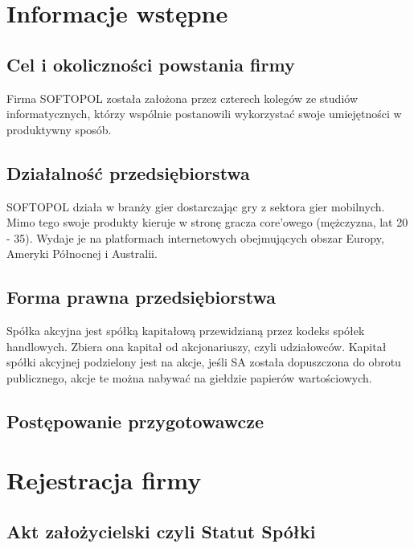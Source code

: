 \documentclass[11pt]{article}
\begin{document}
	\tableofcontents
	\cleardoublepage
	\setcounter{page}{2}
	
	
	\section{Informacje wstępne}
	
	\subsection{Cel i okoliczności powstania firmy}
		Firma SOFTOPOL została założona przez czterech kolegów ze studiów informatycznych, którzy wspólnie postanowili wykorzystać swoje umiejętności w produktywny sposób.
		
	\subsection{Działalność przedsiębiorstwa}
	
		SOFTOPOL działa w branży gier dostarczając gry z sektora gier mobilnych. Mimo tego swoje produkty kieruje w stronę gracza core'owego (mężczyzna, lat 20 - 35). Wydaje je na platformach internetowych obejmujących obszar Europy, Ameryki Północnej i Australii.
	
	\subsection{Forma prawna przedsiębiorstwa}
	
	Spółka akcyjna jest spółką kapitałową przewidzianą przez kodeks spółek handlowych. Zbiera ona kapitał od akcjonariuszy, czyli udziałowców.
Kapitał spółki akcyjnej podzielony jest na akcje, jeśli SA została dopuszczona do obrotu publicznego, akcje te można nabywać na giełdzie papierów wartościowych.

	\subsection{Postępowanie przygotowawcze}
	
	\section{Rejestracja firmy}
	\subsection{Akt założycielski czyli Statut Spółki}
	
\end{document}
